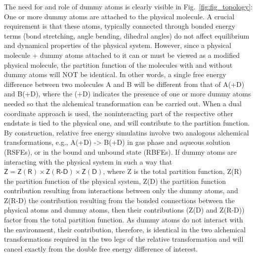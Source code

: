 \documentclass[9pt,bestpractices,pubversion]{livecoms}
\begin{document}
The need for and role of dummy atoms is clearly visible in Fig.~\ref{fig:fig_topology}: One or more dummy atoms are attached to the physical molecule. A crucial requirement is that these atoms, typically connected through bonded energy terms (bond stretching, angle bending, dihedral angles) do not affect equilibrium and dynamical properties of the physical system. However, since a physical molecule + dummy atoms attached to it can or must be viewed as a modified physical molecule, the partition function of the molecules with and without dummy atoms will NOT be identical. In other words, a single free energy difference between two molecules A and B will be different from that of A(+D) and B(+D), where the (+D) indicates the presence of one or more dummy atoms needed so that the alchemical transformation can be carried out. When a dual coordinate approach is used, the noninteracting part of the respective other endstate is tied to the physical one, and will contribute to the partition function. By construction, relative free energy simulatins involve two analogous alchemical transformations, e.g., A(+D) -> B(+D) in gas phase and aqueous solution (RSFEs), or in the bound and unbound state (RBFEs). If dummy atoms are interacting with the physical system in such a way that $\mathsf{Z = Z(R) \times Z(R\text{-}D) \times Z(D)}$, where Z is the total partition function, Z(R) the partition function of the physical system, Z(D) the partition function contribution resulting from interactions between only the dummy atoms, and Z(R-D) the contribution resulting from the bonded connections between the physical atoms and dummy atoms, then their contributions (Z(D) and Z(R-D)) factor from the total partition function. As dummy atoms do not interact with the environment, their contribution, therefore, is identical in the two alchemical transformations required in the two legs of the relative transformation and will cancel exactly from the double free energy difference of interest.
\end{document}
